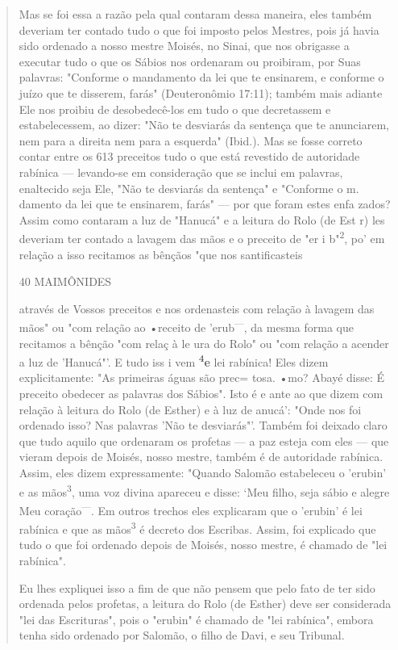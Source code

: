 \begin{quote}
Mas se foi essa a razão pela qual contaram dessa maneira, eles tam­bém
deveriam ter contado tudo o que foi imposto pelos Mestres, pois já havia
sido ordenado a nosso mestre Moisés, no Sinai, que nos obrigasse a
executar tudo o que os Sábios nos ordenaram ou proibiram, por Suas
palavras: "Confor­me o mandamento da lei que te ensinarem, e conforme o
juízo que te disse­rem, farás" (Deuteronômio 17:11); também mais adiante
Ele nos proibiu de desobedecê-los em tudo o que decretassem e
estabelecessem, ao dizer: "Não te desviarás da sentença que te
anunciarem, nem para a direita nem para a es­querda" (Ibid.). Mas se
fosse correto contar entre os 613 preceitos tudo o que está revestido de
autoridade rabínica --- levando-se em consideração que se in­clui em
palavras, enaltecido seja Ele, "Não te desviarás da sentença" e
"Con­forme o m. damento da lei que te ensinarem, farás" --- por que
foram estes enfa zados? Assim como contaram a luz de "Hanucá" e a
leitura do Rolo (de Est r) les deveriam ter contado a lavagem das mãos e
o preceito de "er i b"\textsuperscript{2}, po' em relação a isso
recitamos as bênçãos "que nos santificasteis

40 MAIMÔNIDES

através de Vossos preceitos e nos ordenasteis com relação à lavagem das
mãos" ou "com relação ao •receito de 'erub\textsuperscript{---}, da
mesma forma que recitamos a bên­ção "com relaç à le ura do Rolo" ou "com
relação a acender a luz de 'Hanu­cá"'. E tudo iss i vem
\textbf{\textsuperscript{4}e} lei rabínica! Eles dizem explicitamente:
"As primeiras águas são prec= tosa. •mo? Abayé disse: É preceito
obedecer as palavras dos Sábios". Isto é e ante ao que dizem com relação
à leitura do Rolo (de Es­ther) e à luz de anucá': "Onde nos foi ordenado
isso? Nas palavras 'Não te desviarás"'. Também foi deixado claro que
tudo aquilo que ordenaram os pro­fetas --- a paz esteja com eles --- que
vieram depois de Moisés, nosso mestre, também é de autoridade rabínica.
Assim, eles dizem expressamente: "Quando Salomão estabeleceu o 'erubin'
e as mãos\textsuperscript{3}, uma voz divina apareceu e disse: `Meu
filho, seja sábio e alegre Meu coração\textsuperscript{---}. Em outros
trechos eles explica­ram que o 'erubin' é lei rabínica e que as
mãos\textsuperscript{3} é decreto dos Escribas. Assim, foi explicado que
tudo o que foi ordenado depois de Moisés, nosso mestre, é chamado de
"lei rabínica".

Eu lhes expliquei isso a fim de que não pensem que pelo fato de ter sido
ordenada pelos profetas, a leitura do Rolo (de Esther) deve ser
considera­da "lei das Escrituras", pois o "erubin" é chamado de "lei
rabínica", embora tenha sido ordenado por Salomão, o filho de Davi, e
seu Tribunal.


\end{quote}
